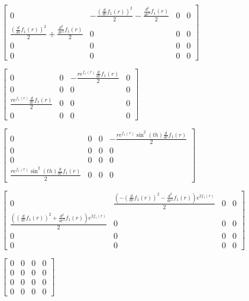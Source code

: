 \documentclass[11pt]{article}
\begin{document}
    
    $\displaystyle \left[\begin{matrix}0 & - \frac{\left(\frac{d}{d r} f_{1}{\left(r \right)}\right)^{2}}{2} - \frac{\frac{d^{2}}{d r^{2}} f_{1}{\left(r \right)}}{2} & 0 & 0\\\frac{\left(\frac{d}{d r} f_{1}{\left(r \right)}\right)^{2}}{2} + \frac{\frac{d^{2}}{d r^{2}} f_{1}{\left(r \right)}}{2} & 0 & 0 & 0\\0 & 0 & 0 & 0\\0 & 0 & 0 & 0\end{matrix}\right]$

    
    $\displaystyle \left[\begin{matrix}0 & 0 & - \frac{r e^{f_{1}{\left(r \right)}} \frac{d}{d r} f_{1}{\left(r \right)}}{2} & 0\\0 & 0 & 0 & 0\\\frac{r e^{f_{1}{\left(r \right)}} \frac{d}{d r} f_{1}{\left(r \right)}}{2} & 0 & 0 & 0\\0 & 0 & 0 & 0\end{matrix}\right]$

    
    $\displaystyle \left[\begin{matrix}0 & 0 & 0 & - \frac{r e^{f_{1}{\left(r \right)}} \sin^{2}{\left(th \right)} \frac{d}{d r} f_{1}{\left(r \right)}}{2}\\0 & 0 & 0 & 0\\0 & 0 & 0 & 0\\\frac{r e^{f_{1}{\left(r \right)}} \sin^{2}{\left(th \right)} \frac{d}{d r} f_{1}{\left(r \right)}}{2} & 0 & 0 & 0\end{matrix}\right]$

    
    $\displaystyle \left[\begin{matrix}0 & \frac{\left(- \left(\frac{d}{d r} f_{1}{\left(r \right)}\right)^{2} - \frac{d^{2}}{d r^{2}} f_{1}{\left(r \right)}\right) e^{2 f_{1}{\left(r \right)}}}{2} & 0 & 0\\\frac{\left(\left(\frac{d}{d r} f_{1}{\left(r \right)}\right)^{2} + \frac{d^{2}}{d r^{2}} f_{1}{\left(r \right)}\right) e^{2 f_{1}{\left(r \right)}}}{2} & 0 & 0 & 0\\0 & 0 & 0 & 0\\0 & 0 & 0 & 0\end{matrix}\right]$

    
    $\displaystyle \left[\begin{matrix}0 & 0 & 0 & 0\\0 & 0 & 0 & 0\\0 & 0 & 0 & 0\\0 & 0 & 0 & 0\end{matrix}\right]$
\end{document}
